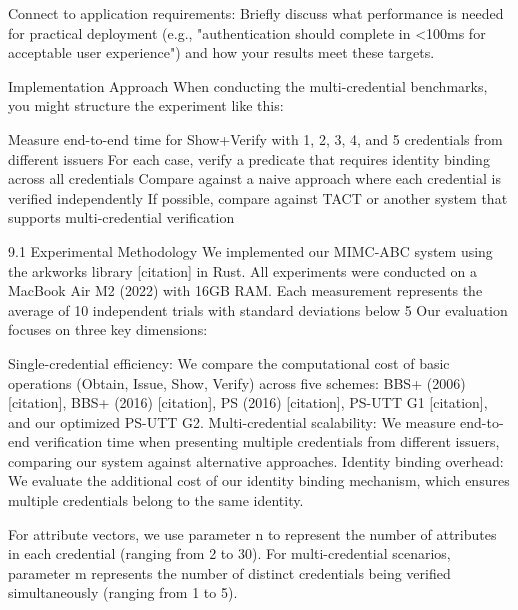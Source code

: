 Connect to application requirements: Briefly discuss what performance is needed for practical deployment (e.g., "authentication should complete in <100ms for acceptable user experience") and how your results meet these targets.

Implementation Approach
When conducting the multi-credential benchmarks, you might structure the experiment like this:

Measure end-to-end time for Show+Verify with 1, 2, 3, 4, and 5 credentials from different issuers
For each case, verify a predicate that requires identity binding across all credentials
Compare against a naive approach where each credential is verified independently
If possible, compare against TACT or another system that supports multi-credential verification






9.1 Experimental Methodology
We implemented our MIMC-ABC system using the arkworks library [citation] in Rust. All experiments were conducted on a MacBook Air M2 (2022) with 16GB RAM. Each measurement represents the average of 10 independent trials with standard deviations below 5%
Our evaluation focuses on three key dimensions:

Single-credential efficiency: We compare the computational cost of basic operations (Obtain, Issue, Show, Verify) across five schemes: BBS+ (2006) [citation], BBS+ (2016) [citation], PS (2016) [citation], PS-UTT G1 [citation], and our optimized PS-UTT G2.
Multi-credential scalability: We measure end-to-end verification time when presenting multiple credentials from different issuers, comparing our system against alternative approaches.
Identity binding overhead: We evaluate the additional cost of our identity binding mechanism, which ensures multiple credentials belong to the same identity.

For attribute vectors, we use parameter n to represent the number of attributes in each credential (ranging from 2 to 30). For multi-credential scenarios, parameter m represents the number of distinct credentials being verified simultaneously (ranging from 1 to 5).



